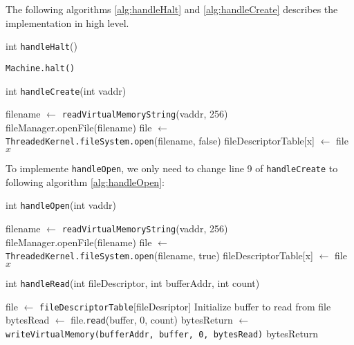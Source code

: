 \documentclass{article}
\begin{document}
\begin{spacing}{1.1}
The following algorithms \ref{alg:handleHalt} and \ref{alg:handleCreate} describes the implementation in high level.

\begin{algorithm}[htbp]
  \label{alg:handleHalt}
  \caption{int \texttt{handleHalt}()}
\begin{algorithmic}[1]
  \ENDIF
  \STATE \texttt{Machine.halt()}
\end{algorithmic}
\end{algorithm}

\begin{algorithm}[htbp]
  \label{alg:handleCreate}
  \caption{int \texttt{handleCreate}(int vaddr)}
\begin{algorithmic}[1]
  \ENDIF
  \STATE filename $\leftarrow$ \texttt{readVirtualMemoryString}(vaddr, 256)
  \ENDIF
    \STATE fileManager.openFile(filename)
    \STATE file $\leftarrow$ \texttt{ThreadedKernel.fileSystem.open}(filename, false)
    \STATE fileDescriptorTable[x] $\leftarrow$ file
    \RETURN $x$
  \ELSE
  \ENDIF
\end{algorithmic}
\end{algorithm}

To implemente \texttt{handleOpen}, we only need to change line 9 of \texttt{handleCreate} to following algorithm \ref{alg:handleOpen}:
\begin{algorithm}[htbp]
  \label{alg:handleOpen}
  \caption{int \texttt{handleOpen}(int vaddr)}
\begin{algorithmic}[1]
  \ENDIF
  \STATE filename $\leftarrow$ \texttt{readVirtualMemoryString}(vaddr, 256)
  \ENDIF
    \STATE fileManager.openFile(filename)
    \STATE \colorbox{myyellow}{file $\leftarrow$ \texttt{ThreadedKernel.fileSystem.open}(filename, true)}
    \STATE fileDescriptorTable[x] $\leftarrow$ file
    \RETURN $x$
  \ELSE
  \ENDIF
\end{algorithmic}
\end{algorithm}

\begin{algorithm}[htbp]
  \caption{int \texttt{handleRead}(int fileDescriptor, int bufferAddr, int count)}
\begin{algorithmic}[1]
  \ENDIF
  \STATE file $\leftarrow$ \texttt{fileDescriptorTable}[fileDesriptor]
  \ENDIF
  \STATE Initialize buffer to read from file
  \STATE bytesRead $\leftarrow$ file.\texttt{read}(buffer, 0, count)
  \ELSE
    \STATE bytesReturn $\leftarrow$ \texttt{writeVirtualMemory(bufferAddr, buffer, 0, bytesRead)}
    \RETURN bytesReturn
  \ENDIF
\end{algorithmic}
\end{algorithm}


\end{spacing}
\end{document}
